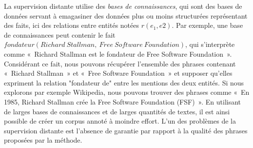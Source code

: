 \documentclass[PhD-Yoann-Dupont.tex]{subfiles}
\begin{document}
La supervision distante utilise des \emph{bases de connaissances}, qui sont des bases de données servant à emagasiner des données plus ou moins structurées représentant des faits, ici des relations entre entités notées $r(e_{1},e{2})$. Par exemple, une base de connaissances peut contenir le fait $fondateur(Richard\ Stallman,\ Free\ Software\ Foundation)$, qui s'interprète comme «\ Richard Stallman est le fondateur de Free Software Foundation\ ». Considérant ce fait, nous pouvons récupérer l'ensemble des phrases contenant «\ Richard Stallman\ » et «\ Free Software Foundation\ » et supposer qu'elles expriment la relation "fondateur de" entre les mentions des deux entités. Si nous explorons par exemple Wikipedia, nous pouvons trouver des phrases comme «\ En 1985, Richard Stallman crée la Free Software Foundation (FSF)\ ». En utilisant de larges bases de connaissances et de larges quantités de textes, il est ainsi possible de créer un corpus annoté à moindre effort. L'un des problèmes de la supervision distante est l'absence de garantie par rapport à la qualité des phrases proposées par la méthode.
\end{document}
